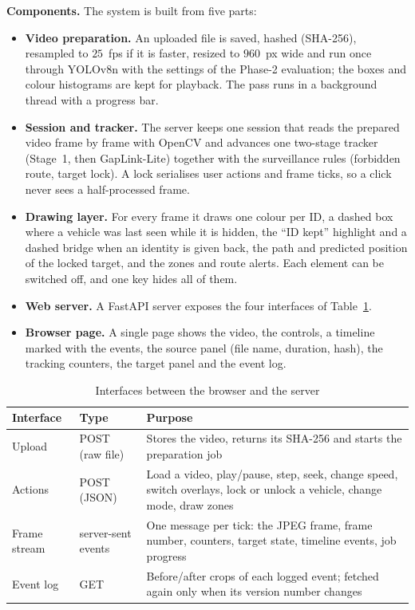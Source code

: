 \textbf{Components.} The system is built from five parts:
\begin{itemize}
    \item \textbf{Video preparation.} An uploaded file is saved, hashed (SHA-256), resampled to $25$~fps if it is faster, resized to $960$~px wide and run once through YOLOv8n with the settings of the Phase-2 evaluation; the boxes and colour histograms are kept for playback. The pass runs in a background thread with a progress bar.
    \item \textbf{Session and tracker.} The server keeps one session that reads the prepared video frame by frame with OpenCV and advances one two-stage tracker (Stage~1, then GapLink-Lite) together with the surveillance rules (forbidden route, target lock). A lock serialises user actions and frame ticks, so a click never sees a half-processed frame.
    \item \textbf{Drawing layer.} For every frame it draws one colour per ID, a dashed box where a vehicle was last seen while it is hidden, the ``ID kept'' highlight and a dashed bridge when an identity is given back, the path and predicted position of the locked target, and the zones and route alerts. Each element can be switched off, and one key hides all of them.
    \item \textbf{Web server.} A FastAPI server exposes the four interfaces of Table~\ref{tab:api}.
    \item \textbf{Browser page.} A single page shows the video, the controls, a timeline marked with the events, the source panel (file name, duration, hash), the tracking counters, the target panel and the event log.
\end{itemize}

\begin{table}[H]
    \centering
    \caption{Interfaces between the browser and the server}
    \label{tab:api}
    \small
    \begin{tabularx}{\textwidth}{l l X}
        \toprule
        \textbf{Interface} & \textbf{Type} & \textbf{Purpose} \\
        \midrule
        Upload & POST (raw file) & Stores the video, returns its SHA-256 and starts the preparation job \\
        Actions & POST (JSON) & Load a video, play/pause, step, seek, change speed, switch overlays, lock or unlock a vehicle, change mode, draw zones \\
        Frame stream & server-sent events & One message per tick: the JPEG frame, frame number, counters, target state, timeline events, job progress \\
        Event log & GET & Before/after crops of each logged event; fetched again only when its version number changes \\
        \bottomrule
    \end{tabularx}
\end{table}

